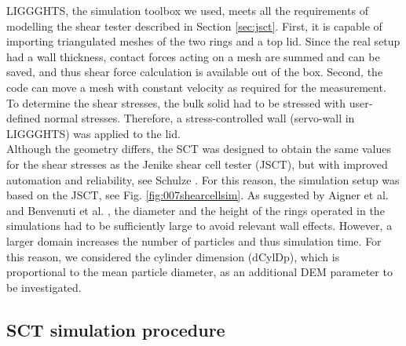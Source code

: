 
\acs{LIGGGHTS}, the simulation toolbox we used, meets all the requirements of
modelling the shear tester described in Section \ref{sec:jsct}. 
First, it is capable of importing triangulated meshes of the two rings and a top lid. 
Since the real setup had a wall thickness, contact forces acting on a mesh are summed and can be saved, 
and thus shear force calculation is available out of the box. 
Second, the code can move a mesh with constant 
velocity as required for the measurement. 
To determine the shear stresses, the bulk solid had to be stressed with 
user-defined normal stresses. 
Therefore, a stress-controlled wall (servo-wall in \acs{LIGGGHTS}) was applied to the lid. \\
Although the geometry differs, the \acs{SCT} was designed to obtain the same values for the shear stresses as the 
Jenike shear cell tester (\acs{JSCT}), but with improved automation and reliability,
see Schulze \cite{RefWorks:118}. 
For this reason, the simulation setup was
based on the \acs{JSCT}, see Fig. \ref{fig:007shearcellsim}.
As suggested by Aigner et al. \cite{RefWorks:139} and Benvenuti et al. \cite{RefWorks:173}, 
the diameter and the height of the rings operated in the simulations had to be sufficiently large to avoid relevant wall effects. 
However, a larger domain increases the number of particles and thus
simulation time.
For this reason, we considered the cylinder dimension (\acs{dCylDp}), which is
proportional to the mean particle diameter, as an additional \acs{DEM}
parameter to be investigated.

\subsection{SCT simulation procedure}
\label{subsec:scsimulation}

